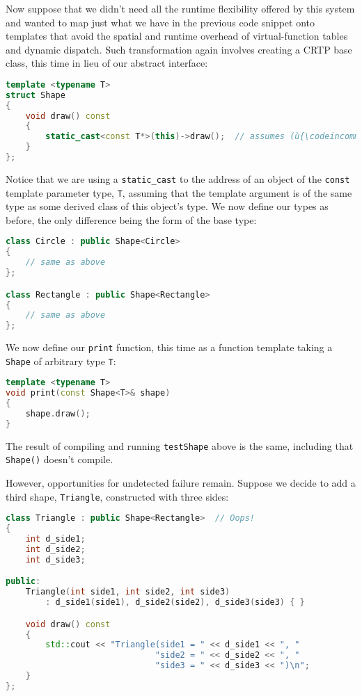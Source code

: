 \noindent Now suppose that we didn't need all the runtime flexibility offered by
this system and wanted to map just what we have in the previous code
snippet onto templates that avoid the spatial and runtime overhead of
virtual-function tables and dynamic dispatch. Such transformation again
involves creating a CRTP base class, this time in lieu of our abstract
interface:

\begin{lstlisting}[language=C++]
template <typename T>
struct Shape
{
    void draw() const
    {
        static_cast<const T*>(this)->draw();  // assumes (ù{\codeincomments{T}}ù) derives from (ù{\codeincomments{Shape}}ù)
    }
};
\end{lstlisting}

\noindent Notice that we are using a \texttt{static\_cast} to the address of an
object of the \texttt{const} template parameter type, \texttt{T},
assuming that the template argument is of the same type as some derived
class of this object's type. We now define our types as before, the only
difference being the form of the base type:

\begin{lstlisting}[language=C++]
class Circle : public Shape<Circle>
{
    // same as above
};

class Rectangle : public Shape<Rectangle>
{
    // same as above
};
\end{lstlisting}

\noindent We now define our \texttt{print} function, this time as a function
template taking a \texttt{Shape} of arbitrary type \texttt{T}:

\begin{lstlisting}[language=C++]
template <typename T>
void print(const Shape<T>& shape)
{
    shape.draw();
}
\end{lstlisting}

\noindent The result of compiling and running \texttt{testShape} above is the
same, including that \texttt{Shape()} doesn't compile.

However, opportunities for undetected failure remain. Suppose we decide
to add a third shape, \texttt{Triangle}, constructed with three sides:

\begin{lstlisting}[language=C++]
class Triangle : public Shape<Rectangle>  // Oops!
{
    int d_side1;
    int d_side2;
    int d_side3;

public:
    Triangle(int side1, int side2, int side3)
        : d_side1(side1), d_side2(side2), d_side3(side3) { }

    void draw() const
    {
        std::cout << "Triangle(side1 = " << d_side1 << ", "
                              "side2 = " << d_side2 << ", "
                              "side3 = " << d_side3 << ")\n";
    }
};
\end{lstlisting}

